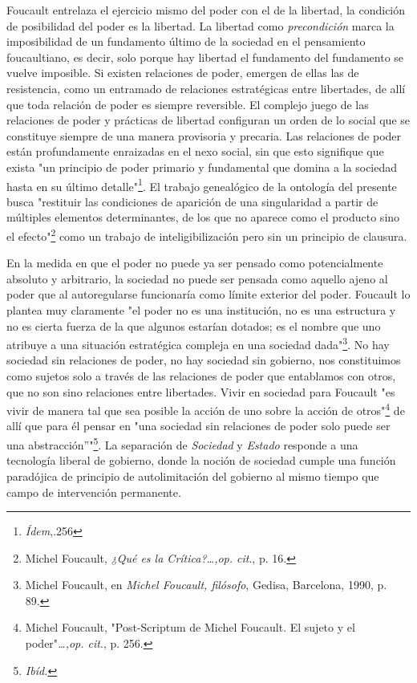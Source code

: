 Foucault entrelaza el ejercicio mismo del poder con el de la libertad,
la condición de posibilidad del poder es la libertad. La libertad como
\emph{precondición} marca la imposibilidad de un fundamento último de la
sociedad en el pensamiento foucaultiano, es decir, solo porque hay
libertad el fundamento del fundamento se vuelve imposible. Si existen
relaciones de poder, emergen de ellas las de resistencia, como un
entramado de relaciones estratégicas entre libertades, de allí que toda
relación de poder es siempre reversible. El complejo juego de las
relaciones de poder y prácticas de libertad configuran un orden de lo
social que se constituye siempre de una manera provisoria y precaria.
Las relaciones de poder están profundamente enraizadas en el nexo
social, sin que esto signifique que exista "un principio de poder
primario y fundamental que domina a la sociedad hasta en su último
detalle"\footnote{\emph{Ídem},.256}. El trabajo genealógico de la
ontología del presente busca "restituir las condiciones de aparición de
una singularidad a partir de múltiples elementos determinantes, de los
que no aparece como el producto sino el efecto"\footnote{Michel
  Foucault, \emph{¿Qué es la Crítica?\ldots,op. cit}., p. 16.} como un
trabajo de inteligibilización pero sin un principio de clausura.

En la medida en que el poder no puede ya ser pensado como potencialmente
absoluto y arbitrario, la sociedad no puede ser pensada como aquello
ajeno al poder que al autoregularse funcionaría como límite exterior del
poder. Foucault lo plantea muy claramente "el poder no es una
institución, no es una estructura y no es cierta fuerza de la que
algunos estarían dotados; es el nombre que uno atribuye a una situación
estratégica compleja en una sociedad dada"\footnote{Michel Foucault, en
  \emph{Michel Foucault, filósofo}, Gedisa, Barcelona, 1990, p. 89.}. No
hay sociedad sin relaciones de poder, no hay sociedad sin gobierno, nos
constituimos como sujetos solo a través de las relaciones de poder que
entablamos con otros, que no son sino relaciones entre libertades. Vivir
en sociedad para Foucault "es vivir de manera tal que sea posible la
acción de uno sobre la acción de otros"\footnote{Michel Foucault,
  "Post-Scriptum de Michel Foucault. El sujeto y el
  poder"\emph{\ldots,op. cit}., p. 256.} de allí que para él pensar en
"una sociedad sin relaciones de poder solo puede ser una
abstracción''"\footnote{\emph{Ibíd.}}. La separación de \emph{Sociedad}
y \emph{Estado} responde a una tecnología liberal de gobierno, donde la
noción de sociedad cumple una función paradójica de principio de
autolimitación del gobierno al mismo tiempo que campo de intervención
permanente.

